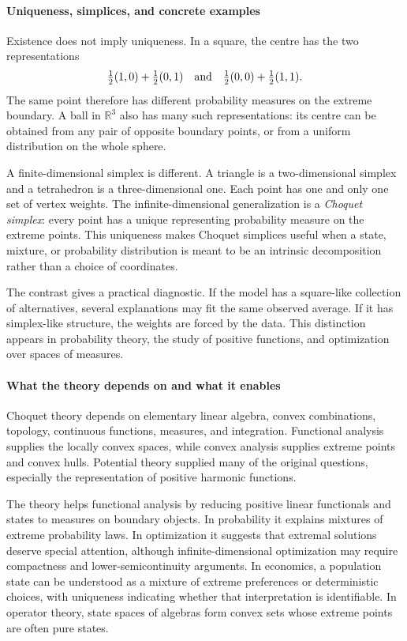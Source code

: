 \paragraph{Uniqueness, simplices, and concrete examples}

Existence does not imply uniqueness. In a square, the centre has the two representations
\[
 \tfrac12(1,0)+\tfrac12(0,1)
 \quad\hbox{and}\quad
 \tfrac12(0,0)+\tfrac12(1,1).
\]
The same point therefore has different probability measures on the extreme boundary. A ball in $\mathbb R^3$ also has many such representations: its centre can be obtained from any pair of opposite boundary points, or from a uniform distribution on the whole sphere.

A finite-dimensional simplex is different. A triangle is a two-dimensional simplex and a tetrahedron is a three-dimensional one. Each point has one and only one set of vertex weights. The infinite-dimensional generalization is a \emph{Choquet simplex}: every point has a unique representing probability measure on the extreme points. This uniqueness makes Choquet simplices useful when a state, mixture, or probability distribution is meant to be an intrinsic decomposition rather than a choice of coordinates. \cite{choquet_theory_ref1}

 The contrast gives a practical diagnostic. If the model has a square-like collection of alternatives, several explanations may fit the same observed average. If it has simplex-like structure, the weights are forced by the data. This distinction appears in probability theory, the study of positive functions, and optimization over spaces of measures.

\paragraph{What the theory depends on and what it enables}

Choquet theory depends on elementary linear algebra, convex combinations, topology, continuous functions, measures, and integration. Functional analysis supplies the locally convex spaces, while convex analysis supplies extreme points and convex hulls. Potential theory supplied many of the original questions, especially the representation of positive harmonic functions. \cite{choquet_theory_ref1,choquet_theory_ref4}

The theory helps functional analysis by reducing positive linear functionals and states to measures on boundary objects. In probability it explains mixtures of extreme probability laws. In optimization it suggests that extremal solutions deserve special attention, although infinite-dimensional optimization may require compactness and lower-semicontinuity arguments. In economics, a population state can be understood as a mixture of extreme preferences or deterministic choices, with uniqueness indicating whether that interpretation is identifiable. In operator theory, state spaces of algebras form convex sets whose extreme points are often pure states.

